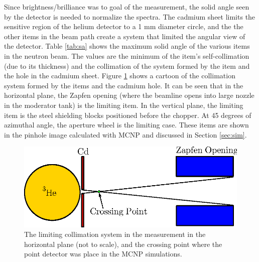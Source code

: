 \documentclass[5p,12pt]{elsarticle}
\begin{document}
Since brightness/brilliance was to goal of the measurement, the solid angle seen by the detector is needed to normalize the spectra.  The cadmium sheet limits the sensitive region of the helium detector to a 1 mm diameter circle, and the the other items in the beam path create a system that limited the angular view of the detector.  Table \ref{tab:sa} shows the maximum solid angle of the various items in the neutron beam.  The values are the minimum of the item's self-collimation (due to its thickness) and the collimation of the system formed by the item and the hole in the cadmium sheet.  Figure \ref{fig:solid_angle} shows a cartoon of the collimation system formed by the items and the cadmium hole.  It can be seen that in the horizontal plane, the Zapfen opening (where the beamline opens into large nozzle in the moderator tank) is the limiting item.  In the vertical plane, the limiting item is the steel shielding blocks positioned before the chopper.  At 45 degrees of azimuthal angle, the aperture wheel is the limiting case.  These items are shown in the pinhole image calculated with MCNP and discussed in Section \ref{sec:sim}.

\begin{figure}[h!] 
  \centering
    \includegraphics[width=\columnwidth]{graphics/solid_angle.eps}
     \caption{The limiting collimation system in the measurement in the horizontal plane (not to scale), and the crossing point where the point detector was place in the MCNP simulations. \label{fig:solid_angle}}
\end{figure}
\end{document}
